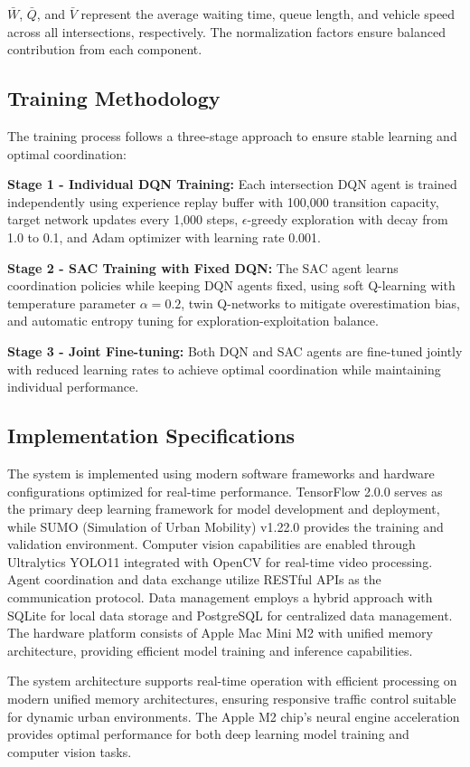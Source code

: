 $\bar{W}$, $\bar{Q}$, and $\bar{V}$ represent the average waiting time, queue length, and vehicle speed 
across all intersections, respectively. The normalization factors ensure balanced contribution from each 
component.

\subsection{Training Methodology}\label{subsec2a-5}

The training process follows a three-stage approach to ensure stable learning and optimal coordination:

\textbf{Stage 1 - Individual DQN Training:} Each intersection DQN agent is trained independently using 
experience replay buffer with 100,000 transition capacity, target network updates every 1,000 steps, 
$\epsilon$-greedy exploration with decay from 1.0 to 0.1, and Adam optimizer with learning rate 0.001.

\textbf{Stage 2 - SAC Training with Fixed DQN:} The SAC agent learns coordination policies while keeping 
DQN agents fixed, using soft Q-learning with temperature parameter $\alpha = 0.2$, twin Q-networks to 
mitigate overestimation bias, and automatic entropy tuning for exploration-exploitation balance.

\textbf{Stage 3 - Joint Fine-tuning:} Both DQN and SAC agents are fine-tuned jointly with reduced learning 
rates to achieve optimal coordination while maintaining individual performance.

\subsection{Implementation Specifications}\label{subsec2a-6}

The system is implemented using modern software frameworks and hardware configurations optimized 
for real-time performance. TensorFlow 2.0.0 serves as the primary deep learning framework for model 
development and deployment, while SUMO (Simulation of Urban Mobility) v1.22.0 provides the training 
and validation environment. Computer vision capabilities are enabled through Ultralytics YOLO11 
integrated with OpenCV for real-time video processing. Agent coordination and data exchange utilize 
RESTful APIs as the communication protocol. Data management employs a hybrid approach with SQLite for 
local data storage and PostgreSQL for centralized data management. The hardware platform consists of 
Apple Mac Mini M2 with unified memory architecture, providing efficient model training and inference 
capabilities.

The system architecture supports real-time operation with efficient processing on modern unified memory 
architectures, ensuring responsive traffic control suitable for dynamic urban environments. The Apple M2 
chip's neural engine acceleration provides optimal performance for both deep learning model training and 
computer vision tasks.
